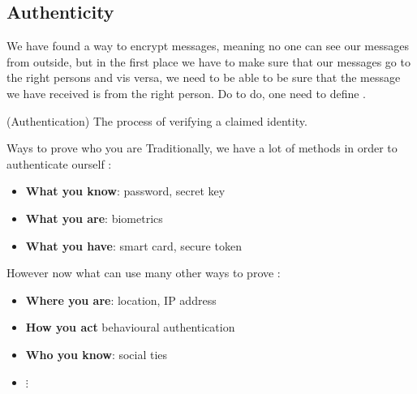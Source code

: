 \subsection{Authenticity}
We have found a way to encrypt messages, meaning no one can see our messages from outside, but in the first place we have to make sure that our messages go to the right persons and vis versa, we need to be able to be sure that the message we have received is from the right person. Do to do, one need to define . 
\begin{definition}{(Authentication)}
	The process of verifying a claimed identity.
\end{definition}
\begin{parag}{Ways to prove who you are}
    Traditionally, we have a lot of methods in order to authenticate ourself :
	\begin{itemize}
	    \item \textbf{What you know}: password, secret key
	    \item \textbf{What you are}: biometrics
	    \item \textbf{What you have}: smart card, secure token
	\end{itemize}
	However now what can use many other ways to prove :
	\begin{itemize}
	    \item \textbf{Where you are}: location, IP address
	    \item \textbf{How you act} behavioural authentication
	    \item \textbf{Who you know}: social ties
	    \item $\vdots$
	\end{itemize}
	
	
\end{parag}

